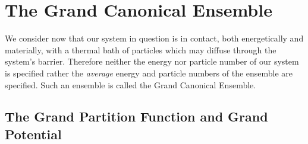 \documentclass[12pt]{article}
\begin{document}
\section{The Grand Canonical Ensemble}
 
We consider now that our system in question is in contact, both energetically and materially, with a thermal bath of particles which may diffuse through the system's barrier. Therefore neither the energy nor particle number of our system is specified rather the \textit{average} energy and particle numbers of the ensemble are specified. Such an ensemble is called the Grand Canonical Ensemble.

\subsection{The Grand Partition Function and Grand Potential}
 
\end{document}
